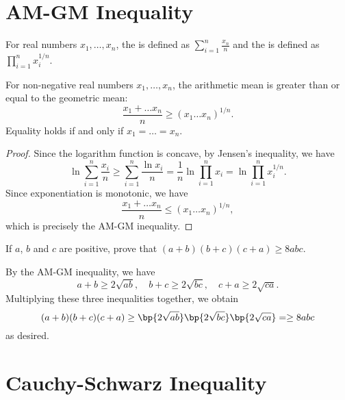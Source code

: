 \section{AM-GM Inequality}

\begin{definition}
    For real numbers $x_1, \dots, x_n$, the  is defined as $\sum_{i = 1}^n \frac{x_n}{n}$ and the  is defined as $\prod_{i = 1}^n x_i^{1/n}$.
\end{definition}

\begin{theorem}[AM-GM Inequality]
    For non-negative real numbers $x_1, \dots, x_n$, the arithmetic mean is greater than or equal to the geometric mean: \[\frac{x_1 + \dots x_n}{n} \geq (x_1 \dots x_n)^{1/n}.\] Equality holds if and only if $x_1 = \dots = x_n$.
\end{theorem}
\begin{proof}
    Since the logarithm function is concave, by Jensen's inequality, we have \[\ln{\sum_{i = 1}^n \frac{x_i}n} \geq \sum_{i = 1}^n \frac{\ln{x_i}}n = \frac1n \ln{\prod_{i = 1}^n x_i} = \ln{\prod_{i = 1}^n x_i^{1/n}}.\] Since exponentiation is monotonic, we have \[\frac{x_1 + \dots x_n}{n} \leq (x_1 \dots x_n)^{1/n},\] which is precisely the AM-GM inequality.
\end{proof}

\begin{sample}
    If $a$, $b$ and $c$ are positive, prove that $(a+b)(b+c)(c+a) \geq 8abc$.
\end{sample}
\begin{sampans}
    By the AM-GM inequality, we have \[a + b \geq 2\sqrt{ab}, \quad b + c \geq 2\sqrt{bc}, \quad c + a \geq 2\sqrt{ca}.\] Multiplying these three inequalities together, we obtain \[(a+b)(b+c)(c+a) \geq \bp{2\sqrt{ab}}\bp{2\sqrt{bc}}\bp{2\sqrt{ca}} = \geq 8abc\] as desired.
\end{sampans}

\section{Cauchy-Schwarz Inequality}

